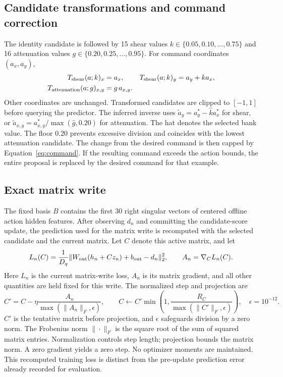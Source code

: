 \subsection{Candidate transformations and command correction}
The identity candidate is followed by 15 shear values
$k\in\{0.05,0.10,\ldots,0.75\}$ and 16 attenuation values
$g\in\{0.20,0.25,\ldots,0.95\}$. For command coordinates $(a_x,a_y)$,
\begin{align}
 T_{\rm shear}(a;k)_x&=a_x,&
 T_{\rm shear}(a;k)_y&=a_y+ka_x,\\
 T_{\rm attenuation}(a;g)_{x,y}&=g\,a_{x,y}.&&
\end{align}
Other coordinates are unchanged. Transformed candidates are clipped to
$[-1,1]$ before querying the predictor. The inferred inverse uses
$\tilde a_y=a_y^*-\hat k a_x^*$ for shear, or
$\tilde a_{x,y}=a_{x,y}^*/\max(\hat g,0.20)$ for attenuation.
The hat denotes the selected bank value. The floor $0.20$ prevents excessive
division and coincides with the lowest attenuation candidate. The change
from the desired command is then capped by Equation~\eqref{eq:command}.
If the resulting command exceeds the action bounds, the entire proposal is
replaced by the desired command for that example.

\subsection{Exact matrix write}
\label{app:matrix-update}
The fixed basis $B$ contains the first 30 right singular vectors of centered
offline action hidden features. After observing $d_n$ and committing the
candidate-score update, the prediction used for the matrix write is recomputed
with the selected candidate and the current matrix. Let $C$ denote this
active matrix, and let
\begin{equation}
 L_n(C)=\frac1{D_q}\|W_{\rm out}(h_n+Cz_n)+b_{\rm out}-d_n\|_2^2,
 \qquad A_n=\nabla_C L_n(C).
\end{equation}
Here $L_n$ is the current matrix-write loss, $A_n$ is its matrix gradient, and
all other quantities are held fixed
for this write. The normalized step and projection are
\begin{equation}
 C'=C-\eta\frac{A_n}{\max(\|A_n\|_F,\epsilon)},\qquad
 C\leftarrow C'\min\!\left(1,\frac{R_C}{\max(\|C'\|_F,\epsilon)}\right),
 \quad \epsilon=10^{-12}.
 \label{eq:update}
\end{equation}
$C'$ is the tentative matrix before projection, and $\epsilon$ safeguards
division by a zero norm. The Frobenius norm $\|\cdot\|_F$ is the square root of the sum of squared
matrix entries. Normalization controls step length; projection bounds the
matrix norm. A zero gradient yields a zero step. No optimizer moments are
maintained. This recomputed training loss is distinct from the pre-update
prediction error already recorded for evaluation.

